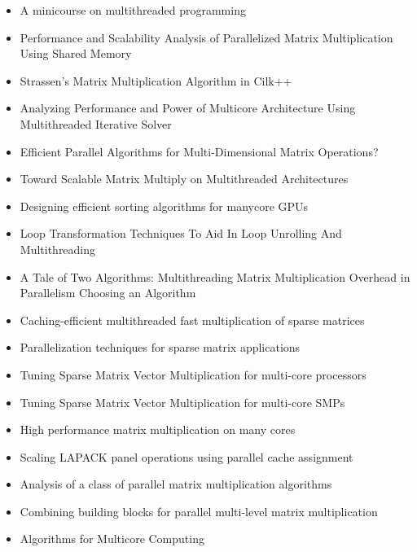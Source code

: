 \begin{itemize}
\item[\textbullet] A minicourse on multithreaded programming
  \cite{Leiserson1998}
\item[\textbullet] Performance and Scalability Analysis of
  Parallelized Matrix Multiplication Using Shared Memory
  \cite{Dinkins2007}
\item[\textbullet] Strassen's Matrix Multiplication Algorithm in
  Cilk++ \cite{Kuszmaul2009}
\item[\textbullet] Analyzing Performance and Power of Multicore
  Architecture Using Multithreaded Iterative Solver \cite{Lee2010}
\item[\textbullet] Efficient Parallel Algorithms for Multi-Dimensional
  Matrix Operations? \cite{Liu2000}
\item[\textbullet] Toward Scalable Matrix Multiply on Multithreaded
  Architectures \cite{Marker2007}
\item[\textbullet] Designing efficient sorting algorithms for manycore
  GPUs \cite{Satish2009}
\item[\textbullet] Loop Transformation Techniques To Aid In Loop
  Unrolling And Multithreading \cite{Song2003}
\item[\textbullet] A Tale of Two Algorithms: Multithreading Matrix
  Multiplication Overhead in Parallelism Choosing an Algorithm
  \cite{Steele2010}
\item[\textbullet] Caching-efficient multithreaded fast multiplication
  of sparse matrices \cite{Sulatycke1998}
\item[\textbullet] Parallelization techniques for sparse matrix
  applications \cite{Ujaldon1996}
\item[\textbullet] Tuning Sparse Matrix Vector Multiplication for
  multi-core processors \cite{Williams2007}
\item[\textbullet] Tuning Sparse Matrix Vector Multiplication for
  multi-core SMPs \cite{Williams2007a}
\item[\textbullet] High performance matrix multiplication on many
  cores \cite{Yuan2009}
\item[\textbullet] Scaling LAPACK panel operations using parallel
  cache assignment \cite{Castaldo2010}
\item[\textbullet] Analysis of a class of parallel matrix
  multiplication algorithms \cite{Gunnels1998}
\item[\textbullet] Combining building blocks for parallel multi-level
  matrix multiplication \cite{Hunold2008}
\item[\textbullet] Algorithms for Multicore Computing

\end{itemize}

